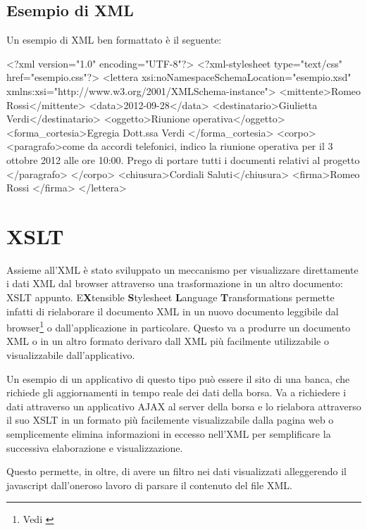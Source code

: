 \documentclass[a4paper,12pt]{report}
\begin{document}
\subsection{Esempio di XML}
Un esempio di XML ben formattato è il seguente:
\begin{xml}
<?xml version="1.0" encoding="UTF-8"?>
 <?xml-stylesheet type="text/css" href="esempio.css"?>
  <lettera xsi:noNamespaceSchemaLocation="esempio.xsd"
    xmlns:xsi="http://www.w3.org/2001/XMLSchema-instance">
  <mittente>Romeo Rossi</mittente>
  <data>2012-09-28</data>
  <destinatario>Giulietta Verdi</destinatario>
  <oggetto>Riunione operativa</oggetto>
  <forma_cortesia>Egregia Dott.ssa Verdi </forma_cortesia>
  <corpo>
   <paragrafo>come da accordi telefonici, 
     indico la riunione operativa per il 3 
     ottobre 2012 alle ore 10:00. 
     Prego di portare tutti i documenti relativi al progetto
   </paragrafo>
 </corpo>
 <chiusura>Cordiali Saluti</chiusura>
 <firma>Romeo Rossi
 </firma>
</lettera>
\end{xml}


\section{XSLT}
Assieme all'XML è stato sviluppato un meccanismo per visualizzare direttamente i dati XML dal browser attraverso una trasformazione in un altro documento: XSLT appunto.
E\textbf{X}tensible \textbf{S}tylesheet \textbf{L}anguage \textbf{T}ransformations permette infatti di rielaborare il documento XML in un nuovo documento leggibile dal browser\footnote{Vedi \cite{site:w3cxslt}} o dall'applicazione in particolare. Questo va a produrre un documento XML o in un altro formato derivaro dall XML più facilmente utilizzabile o visualizzabile dall'applicativo.


Un esempio di un applicativo di questo tipo può essere il sito di una banca, che richiede gli aggiornamenti in tempo reale dei dati della borsa. Va a richiedere i dati attraverso un applicativo AJAX al server della borsa e lo rielabora attraverso il suo XSLT in un formato più facilemente visualizzabile dalla pagina web o semplicemente elimina informazioni in eccesso nell'XML per semplificare la successiva elaborazione e visualizzazione.

Questo permette, in oltre, di avere un filtro nei dati visualizzati alleggerendo il javascript dall'oneroso lavoro di parsare il contenuto del file XML.
\end{document}
